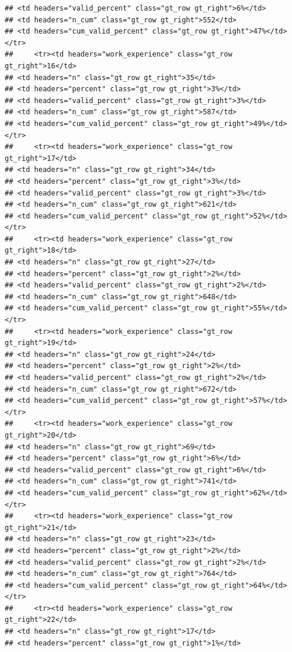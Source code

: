 \documentclass[
  a4paper,
  DIV=11,
  numbers=noendperiod]{scrartcl}
\begin{document}
\begin{verbatim}
## <td headers="valid_percent" class="gt_row gt_right">6%</td>
## <td headers="n_cum" class="gt_row gt_right">552</td>
## <td headers="cum_valid_percent" class="gt_row gt_right">47%</td></tr>
##     <tr><td headers="work_experience" class="gt_row gt_right">16</td>
## <td headers="n" class="gt_row gt_right">35</td>
## <td headers="percent" class="gt_row gt_right">3%</td>
## <td headers="valid_percent" class="gt_row gt_right">3%</td>
## <td headers="n_cum" class="gt_row gt_right">587</td>
## <td headers="cum_valid_percent" class="gt_row gt_right">49%</td></tr>
##     <tr><td headers="work_experience" class="gt_row gt_right">17</td>
## <td headers="n" class="gt_row gt_right">34</td>
## <td headers="percent" class="gt_row gt_right">3%</td>
## <td headers="valid_percent" class="gt_row gt_right">3%</td>
## <td headers="n_cum" class="gt_row gt_right">621</td>
## <td headers="cum_valid_percent" class="gt_row gt_right">52%</td></tr>
##     <tr><td headers="work_experience" class="gt_row gt_right">18</td>
## <td headers="n" class="gt_row gt_right">27</td>
## <td headers="percent" class="gt_row gt_right">2%</td>
## <td headers="valid_percent" class="gt_row gt_right">2%</td>
## <td headers="n_cum" class="gt_row gt_right">648</td>
## <td headers="cum_valid_percent" class="gt_row gt_right">55%</td></tr>
##     <tr><td headers="work_experience" class="gt_row gt_right">19</td>
## <td headers="n" class="gt_row gt_right">24</td>
## <td headers="percent" class="gt_row gt_right">2%</td>
## <td headers="valid_percent" class="gt_row gt_right">2%</td>
## <td headers="n_cum" class="gt_row gt_right">672</td>
## <td headers="cum_valid_percent" class="gt_row gt_right">57%</td></tr>
##     <tr><td headers="work_experience" class="gt_row gt_right">20</td>
## <td headers="n" class="gt_row gt_right">69</td>
## <td headers="percent" class="gt_row gt_right">6%</td>
## <td headers="valid_percent" class="gt_row gt_right">6%</td>
## <td headers="n_cum" class="gt_row gt_right">741</td>
## <td headers="cum_valid_percent" class="gt_row gt_right">62%</td></tr>
##     <tr><td headers="work_experience" class="gt_row gt_right">21</td>
## <td headers="n" class="gt_row gt_right">23</td>
## <td headers="percent" class="gt_row gt_right">2%</td>
## <td headers="valid_percent" class="gt_row gt_right">2%</td>
## <td headers="n_cum" class="gt_row gt_right">764</td>
## <td headers="cum_valid_percent" class="gt_row gt_right">64%</td></tr>
##     <tr><td headers="work_experience" class="gt_row gt_right">22</td>
## <td headers="n" class="gt_row gt_right">17</td>
## <td headers="percent" class="gt_row gt_right">1%</td>

\end{verbatim}
\end{document}
